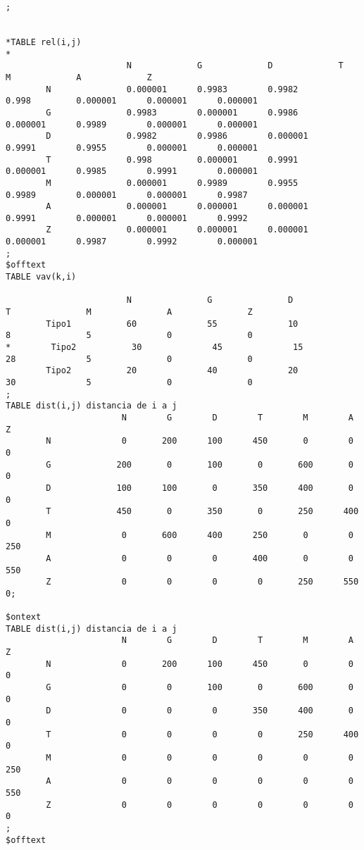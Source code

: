 \documentclass[]{article}
\begin{document}
\begin{lstlisting}
;


*TABLE rel(i,j)
*
                        N             G             D             T             M             A             Z
        N               0.000001      0.9983        0.9982        0.998         0.000001      0.000001      0.000001
        G               0.9983        0.000001      0.9986        0.000001      0.9989        0.000001      0.000001
        D               0.9982        0.9986        0.000001      0.9991        0.9955        0.000001      0.000001
        T               0.998         0.000001      0.9991        0.000001      0.9985        0.9991        0.000001
        M               0.000001      0.9989        0.9955        0.9989        0.000001      0.000001      0.9987
        A               0.000001      0.000001      0.000001      0.9991        0.000001      0.000001      0.9992
        Z               0.000001      0.000001      0.000001      0.000001      0.9987        0.9992        0.000001
;
$offtext
TABLE vav(k,i)

                        N               G               D               T               M               A               Z
        Tipo1           60              55              10              8               5               0               0
*        Tipo2           30              45              15              28              5               0               0
        Tipo2           20              40              20              30              5               0               0
;
TABLE dist(i,j) distancia de i a j
                       N        G        D        T        M        A        Z
        N              0       200      100      450       0        0        0
        G             200       0       100       0       600       0        0
        D             100      100       0       350      400       0        0
        T             450       0       350       0       250      400       0
        M              0       600      400      250       0        0       250
        A              0        0        0       400       0        0       550
        Z              0        0        0        0       250      550       0;

$ontext
TABLE dist(i,j) distancia de i a j
                       N        G        D        T        M        A        Z
        N              0       200      100      450       0        0        0
        G              0        0       100       0       600       0        0
        D              0        0        0       350      400       0        0
        T              0        0        0        0       250      400       0
        M              0        0        0        0        0        0       250
        A              0        0        0        0        0        0       550
        Z              0        0        0        0        0        0        0
;
$offtext


\end{lstlisting}
\end{document}
